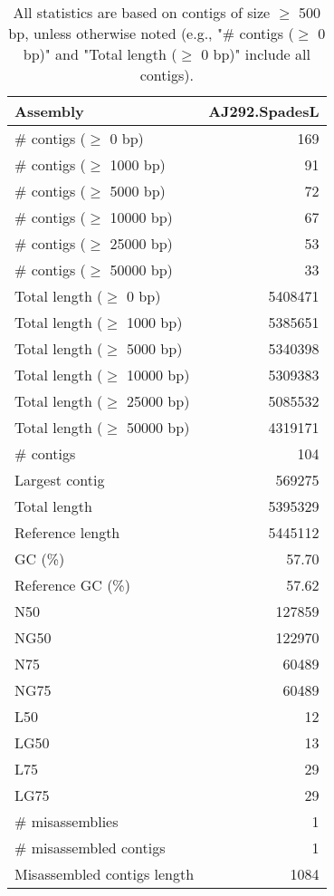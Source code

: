 \documentclass[12pt,a4paper]{article}
\begin{document}
\begin{table}[ht]
\begin{center}
\caption{All statistics are based on contigs of size $\geq$ 500 bp, unless otherwise noted (e.g., "\# contigs ($\geq$ 0 bp)" and "Total length ($\geq$ 0 bp)" include all contigs).}
\begin{tabular}{|l*{1}{|r}|}
\hline
Assembly & AJ292.SpadesL \\ \hline
\# contigs ($\geq$ 0 bp) & 169 \\ \hline
\# contigs ($\geq$ 1000 bp) & 91 \\ \hline
\# contigs ($\geq$ 5000 bp) & 72 \\ \hline
\# contigs ($\geq$ 10000 bp) & 67 \\ \hline
\# contigs ($\geq$ 25000 bp) & 53 \\ \hline
\# contigs ($\geq$ 50000 bp) & 33 \\ \hline
Total length ($\geq$ 0 bp) & 5408471 \\ \hline
Total length ($\geq$ 1000 bp) & 5385651 \\ \hline
Total length ($\geq$ 5000 bp) & 5340398 \\ \hline
Total length ($\geq$ 10000 bp) & 5309383 \\ \hline
Total length ($\geq$ 25000 bp) & 5085532 \\ \hline
Total length ($\geq$ 50000 bp) & 4319171 \\ \hline
\# contigs & 104 \\ \hline
Largest contig & 569275 \\ \hline
Total length & 5395329 \\ \hline
Reference length & 5445112 \\ \hline
GC (\%) & 57.70 \\ \hline
Reference GC (\%) & 57.62 \\ \hline
N50 & 127859 \\ \hline
NG50 & 122970 \\ \hline
N75 & 60489 \\ \hline
NG75 & 60489 \\ \hline
L50 & 12 \\ \hline
LG50 & 13 \\ \hline
L75 & 29 \\ \hline
LG75 & 29 \\ \hline
\# misassemblies & 1 \\ \hline
\# misassembled contigs & 1 \\ \hline
Misassembled contigs length & 1084 \\ \hline

\end{tabular}
\end{center}
\end{table}
\end{document}
